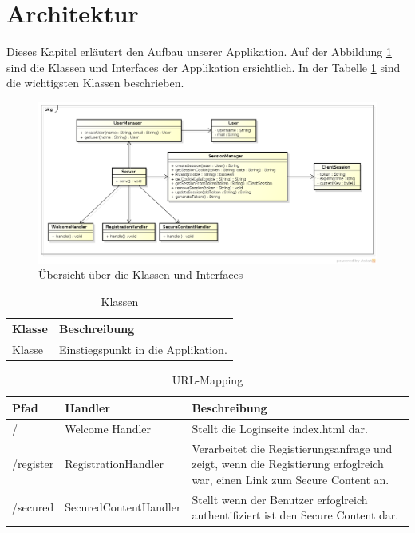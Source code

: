 \section{Architektur}

Dieses Kapitel erläutert den Aufbau unserer Applikation.
Auf der Abbildung \ref{fig:overview} sind die Klassen und Interfaces der Applikation ersichtlich. In der Tabelle \ref{tab:class} sind
die wichtigsten Klassen beschrieben.

\begin{figure}[ht]
	\begin{center}
		\includegraphics[width=1.0\textwidth]{./content/Class_Overview.png}
	\end{center}
	\caption{Übersicht über die Klassen und Interfaces}
	\label{fig:overview}
\end{figure}

\begin{table}[H]
\begin{center}
\begin{tabular}{l p{10.5cm} }
\hline
\textbf{Klasse} & \textbf{Beschreibung} \\ \hline \hline
Klasse & Einstiegspunkt in die Applikation. \\
\hline \hline
\end{tabular}
\caption{Klassen}
\label{tab:class}
\end{center}
\end{table}

\begin{table}[H]
\begin{center}
\begin{tabular}{l l p{7cm} }
\hline
\textbf{Pfad} & \textbf{Handler}    & \textbf{Beschreibung} \\ \hline \hline
/             & Welcome Handler         & Stellt die Loginseite index.html dar.\\
/register     & RegistrationHandler     & Verarbeitet die Registierungsanfrage und zeigt, wenn die Registierung erfoglreich war, einen Link zum Secure Content an. \\
/secured      & SecuredContentHandler   & Stellt wenn der Benutzer erfoglreich authentifiziert ist den Secure Content dar.\\
\hline \hline
\end{tabular}
\caption{URL-Mapping}
\label{tab:url-mapping}
\end{center}
\end{table}

